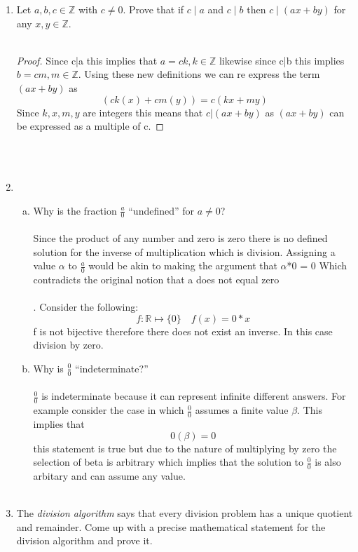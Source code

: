 \documentclass[11pt]{article}
\def\Z{\mathbb{Z}}
\begin{document}
\begin{enumerate}
\item Let $a, b, c \in \Z$ with $c \ne 0$.
Prove that if $c \mid a$ and $c \mid b$ then $c \mid (ax+by)$ for any $x, y \in \Z$.\\\\
\begin{proof}
  Since c|a this implies that $a=ck,k \in \mathbb{Z}$ likewise since c|b this implies $b=cm, m\in \mathbb{Z}$. Using these new definitions we can re express the term $(ax+by)$ as \[
    (ck(x)+cm(y))=c(kx+my)
  \]
  Since $k,x,m,y$ are integers this means that $c|(ax+by)$ as $(ax+by)$ can be expressed as a multiple of c.
\end{proof}
\\\\
\item
\begin{enumerate}[(a)]
  \item Why is the fraction $\frac{a}{0}$ ``undefined'' for $a \ne 0$?\\\\
  Since the product of any number and zero is zero there is no defined solution for the inverse of multiplication which is division. Assigning a value $\alpha$ to $\frac{a}{0}$ would be akin to making the argument that $\alpha$*0 = 0 Which contradicts the original notion that a does not equal zero\\\\. Consider the following:
\[
  f:\mathbb{R} \mapsto \{0\}\quad f(x)=0*x
\]
f is not bijective therefore there does not exist an inverse. In this case division by zero.


  \item Why is $\frac{0}{0}$ ``indeterminate?''
  \\\\
  $\frac{0}{0}$ is indeterminate because it can represent infinite different answers. For example consider the case in which   $\frac{0}{0}$ assumes a finite value $\beta$. This implies that \[
    0(\beta)=0
  \]
  this statement is true but due to the nature of multiplying by zero the selection of beta is arbitrary which implies that the solution to $\frac{0}{0}$ is also arbitary and can assume any value.
  \\\\
\end{enumerate}

\item The \emph{division algorithm} says that every division problem has a unique quotient and remainder.
Come up with a precise mathematical statement for the division algorithm and prove it.


\end{enumerate}
\end{document}
